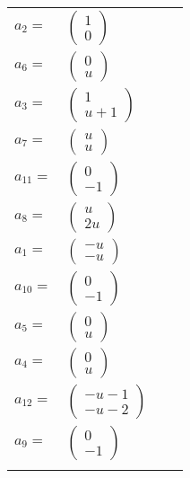 \documentclass[1p]{elsarticle_modified}
\theoremstyle{definition}
\begin{document}
\begin{tabular}{m{7pt} m{180pt} m{7pt} m{180pt} }
\flushright $a_{2}=$&$\begin{pmatrix}1\\0\end{pmatrix}$ \\
\flushright $a_{6}=$&$\begin{pmatrix}0\\u\end{pmatrix}$ \\
\flushright $a_{3}=$&$\begin{pmatrix}1\\u+1\end{pmatrix}$ \\
\flushright $a_{7}=$&$\begin{pmatrix}u\\u\end{pmatrix}$ \\
\flushright $a_{11}=$&$\begin{pmatrix}0\\-1\end{pmatrix}$ \\
\flushright $a_{8}=$&$\begin{pmatrix}u\\2 u\end{pmatrix}$ \\
\flushright $a_{1}=$&$\begin{pmatrix}- u\\- u\end{pmatrix}$ \\
\flushright $a_{10}=$&$\begin{pmatrix}0\\-1\end{pmatrix}$ \\
\flushright $a_{5}=$&$\begin{pmatrix}0\\u\end{pmatrix}$ \\
\flushright $a_{4}=$&$\begin{pmatrix}0\\u\end{pmatrix}$ \\
\flushright $a_{12}=$&$\begin{pmatrix}- u-1\\- u-2\end{pmatrix}$ \\
\flushright $a_{9}=$&$\begin{pmatrix}0\\-1\end{pmatrix}$\\&\end{tabular}
\end{document}
